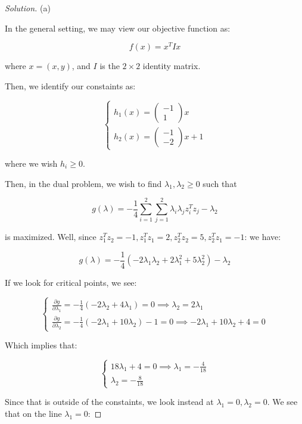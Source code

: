 \documentclass[10pt]{article}
\begin{document}
\begin{proof}[Solution]

(a)

In the general setting, we may view our objective function as:

$$f(x) = x^T I x $$

where $x = (x,y)$, and $I$ is the $2 \times 2$ identity matrix.

Then, we identify our constaints as:

$$\begin{cases} h_1(x) = \begin{pmatrix} -1 \\ 1 \end{pmatrix} x \\ h_2(x) = \begin{pmatrix} -1 \\ -2 \end{pmatrix} x +1 \end{cases}$$

where we wish $h_i \geq 0$. 

Then, in the dual problem, we wish to find $\lambda_1, \lambda_2 \geq 0$ such that

$$g(\lambda) = -\frac{1}{4} \sum_{i=1}^2 \sum_{j=1}^2 \lambda_i \lambda_j z_i^T z_j - \lambda_2$$

is maximized. Well, since $z_1^T z_2 = -1, z_1^T z_1 = 2, z_2 ^T z_2 = 5, z_2^T z_1 = -1$: we have:

$$ g(\lambda) = -\frac{1}{4} (-2 \lambda_1 \lambda_2 + 2 \lambda_1^2 + 5 \lambda_2^2 ) - \lambda_2$$

If we look for critical points, we see:

$$\begin{cases} \frac{\partial g}{\partial \lambda_1} = -\frac{1}{4} (-2 \lambda_2 + 4 \lambda_1) = 0 \implies \lambda_2 = 2 \lambda_1 \\  \frac{\partial g}{\partial \lambda_2} = - \frac{1}{4} (-2 \lambda_1 + 10 \lambda_2) - 1 = 0 \implies  -2\lambda_1 + 10 \lambda_2 + 4 = 0\end{cases} $$ 

Which implies that:

$$\begin{cases} 18 \lambda_1 + 4 = 0 \implies \lambda_1 = -\frac{4}{18} \\ \lambda_2 = -\frac{8}{18} \end{cases} $$

Since that is outside of the constaints, we look instead at $\lambda_1 = 0, \lambda_2 = 0$. We see that on the line $\lambda_1 = 0$:


\end{proof}
\end{document}
